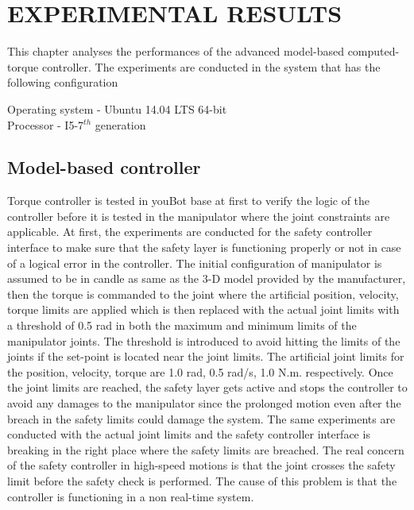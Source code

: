\chapter{EXPERIMENTAL RESULTS}
\label{sec:experiments}
This chapter analyses the performances of the advanced model-based computed-torque controller. The experiments are conducted in the system that has the following configuration

\begin{flushleft}
Operating system - Ubuntu 14.04 LTS 64-bit \\
Processor - I5-7$^{th}$ generation
\end{flushleft}

\section{Model-based controller}

Torque controller is tested in youBot base at first to verify the logic of the controller before it is tested in the manipulator where the joint constraints are applicable. At first, the experiments are conducted for the safety controller interface to make sure that the safety layer is functioning properly or not in case of a logical error in the controller. The initial configuration of manipulator is assumed to be in candle as same as the 3-D model provided by the manufacturer, then the torque is commanded to the joint where the artificial position, velocity, torque limits are applied which is then replaced with the actual joint limits with a threshold of 0.5 rad in both the maximum and minimum limits of the manipulator joints. The threshold is introduced to avoid hitting the limits of the joints if the set-point is located near the joint limits. The artificial joint limits for the position, velocity, torque are 1.0 rad, 0.5 rad/s, 1.0 N.m. respectively. Once the joint limits are reached, the safety layer gets active and stops the controller to avoid any damages to the manipulator since the prolonged motion even after the breach in the safety limits could damage the system. The same experiments are conducted with the actual joint limits and the safety controller interface is breaking in the right place where the safety limits are breached. The real concern of the safety controller in high-speed motions is that the joint crosses the safety limit before the safety check is performed. The cause of this problem is that the controller is functioning in a non real-time system. 

